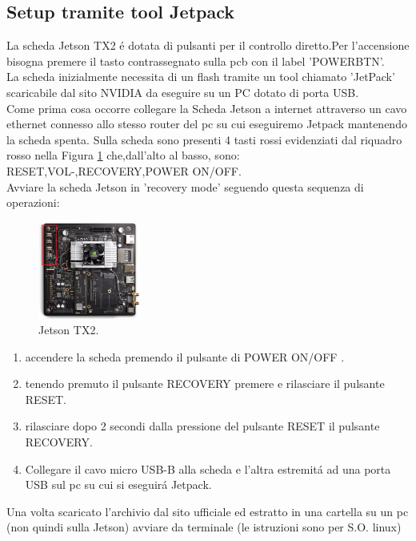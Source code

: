 \documentclass[a4paper]{article}
\begin{document}
\subsection{Setup tramite tool Jetpack}
La scheda Jetson TX2 é dotata di pulsanti per il controllo diretto.Per l'accensione bisogna premere il tasto contrassegnato sulla pcb con il label 'POWERBTN'.\\
La scheda inizialmente necessita di un flash tramite un tool chiamato 'JetPack' scaricabile dal sito NVIDIA da eseguire su un PC dotato di porta USB.\\
Come prima cosa occorre collegare la Scheda Jetson a internet attraverso un cavo ethernet connesso allo stesso router del pc su cui eseguiremo Jetpack mantenendo la scheda spenta.
Sulla scheda sono presenti 4 tasti rossi evidenziati dal riquadro rosso nella Figura \ref{fig:JetsonTX2} che,dall'alto al basso, sono: RESET,VOL-,RECOVERY,POWER ON/OFF.\\
Avviare la scheda Jetson in 'recovery mode' seguendo questa sequenza di operazioni:\\
\vspace{-10pt}
\begin{figure}
    \centering
    
    \includegraphics [width=0.3\textwidth] {NVIDIA_Jetson_TX2_Module_Devkit.png}
   
    \caption{Jetson TX2.}
    \label{fig:JetsonTX2}
\end{figure}
\begin{enumerate} 
    \item accendere la scheda premendo il pulsante di POWER ON/OFF .
    \item tenendo premuto il pulsante RECOVERY premere e rilasciare il pulsante RESET.
    \item rilasciare dopo 2 secondi dalla pressione del pulsante RESET il pulsante RECOVERY.
    \item Collegare il cavo micro USB-B alla scheda e l'altra estremitá ad una porta USB sul pc su cui si eseguirá Jetpack. 
\end{enumerate}
Una volta scaricato l'archivio dal sito ufficiale ed estratto in una cartella su un pc (non quindi sulla Jetson) avviare da terminale (le istruzioni sono per S.O. linux)
\end{document}
